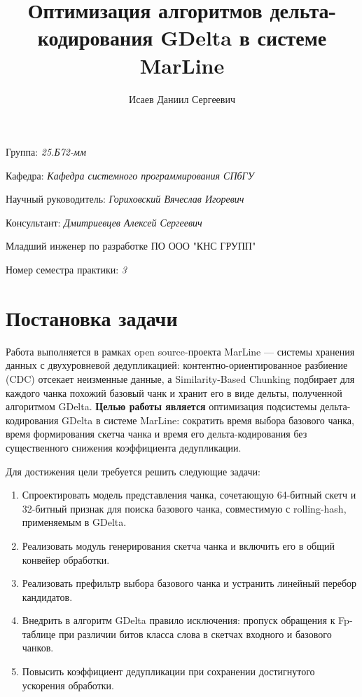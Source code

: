\documentclass[a4paper]{article}
\title{Оптимизация алгоритмов дельта-кодирования GDelta в системе MarLine}
\author{Исаев Даниил Сергеевич}
\date{}
\begin{document}
\maketitle

\begin{flushright}
    Группа: \emph{25.Б72-мм}

    Кафедра: \emph{Кафедра системного программирования СПбГУ}

    Научный руководитель: \emph{Гориховский Вячеслав Игоревич}

    Консультант: \emph{Дмитриевцев Алексей Сергеевич}
    
    Младший инженер по разработке ПО ООО "КНС ГРУПП"
    
    Номер семестра практики: \emph{3}
\end{flushright} 


\section{Постановка задачи}

Работа выполняется в рамках open source-проекта MarLine --- системы хранения данных с двухуровневой дедупликацией: контентно-ориентированное разбиение (CDC) отсекает неизменные данные, а Similarity-Based Chunking подбирает для каждого чанка похожий базовый чанк и хранит его в виде дельты, полученной алгоритмом GDelta. \textbf{Целью работы является} оптимизация подсистемы дельта-кодирования GDelta в системе MarLine: сократить время выбора базового чанка, время формирования скетча чанка и время его дельта-кодирования без существенного снижения коэффициента дедупликации.

Для достижения цели требуется решить следующие задачи:

\begin{enumerate}
    \item Спроектировать модель представления чанка, сочетающую 64-битный скетч и 32-битный признак для поиска базового чанка, совместимую с rolling-hash, применяемым в GDelta.
    \item Реализовать модуль генерирования скетча чанка и включить его в общий конвейер обработки.
    \item Реализовать префильтр выбора базового чанка и устранить линейный перебор кандидатов.
    \item Внедрить в алгоритм GDelta правило исключения: пропуск обращения к Fp-таблице при различии битов класса слова в скетчах входного и базового чанков.
    \item Повысить коэффициент дедупликации при сохранении достигнутого ускорения обработки.
\end{enumerate}
\end{document}
